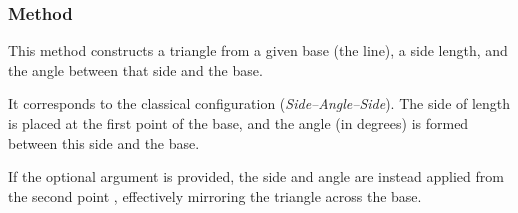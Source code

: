 \begin{minipage}{.5\textwidth}
  \begin{center}
  \end{center}
\end{minipage}
\begin{minipage}{.5\textwidth}
\begin{tkzexample}
\end{tkzexample}
\end{minipage}

\subsubsection{Method }
\label{ssub:_line_sas_d_an}

This method constructs a triangle from a given base (the line), a side length, and the angle between that side and the base.

\medskip

It corresponds to the classical  configuration (\textit{Side–Angle–Side}). The side of length  is placed at the first point  of the base, and the angle  (in degrees) is formed between this side and the base.

\medskip

If the optional argument  is provided, the side and angle are instead applied from the second point , effectively mirroring the triangle across the base.

\vspace{1em}
  \begin{center}
  \end{center}

